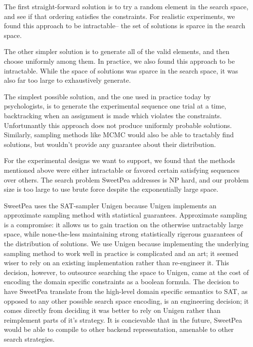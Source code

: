 The first straight-forward solution is to try a random element in the search space, and see if that ordering satisfies the constraints. For realistic experiments, we found this approach to be intractable-- the set of solutions is sparce in the search space.

The other simpler solution is to generate all of the valid elements, and then choose uniformly among them. In practice, we also found this approach to be intractable. While the space of solutions was sparce in the search space, it was also far too large to exhaustively generate.

The simplest possible solution, and the one used in practice today by psychologists, is to generate the experimental sequence one trial at a time, backtracking when an assignment is made which violates the constraints. Unfortunantly this approach does not produce uniformly probable solutions. Similarly, sampling methods like MCMC would also be able to tractably find solutions, but wouldn't provide any guarantee about their distribution.

For the experimental designs we want to support, we found that the methods mentioned above were either intractable or favored certain satisfying sequences over others. The search problem SweetPea addresses is NP hard, and our problem size is too large to use brute force despite the exponentially large space.

SweetPea uses the SAT-sampler Unigen because Unigen implements an approximate sampling method with statistical guarantees. Approximate sampling is a compromise: it allows us to gain traction on the otherwise untractably large space, while none-the-less maintaining strong statistically rigerous guarantees of the distribution of solutions. We use Unigen because implementing the underlying sampling method to work well in practice is complicated and an art; it seemed wiser to rely on an existing implementation rather than re-engineer it. This decision, however, to outsource searching the space to Unigen, came at the cost of encoding the domain specific constraints as a boolean formula. The decision to have SweetPea translate from the high-level domain specific semantics to SAT, as opposed to any other possible search space encoding, is an engineering decision; it comes directly from deciding it was better to rely on Unigen rather than reimplement parts of it's strategy. It is concievable that in the future, SweetPea would be able to compile to other backend representation, amenable to other search strategies.

